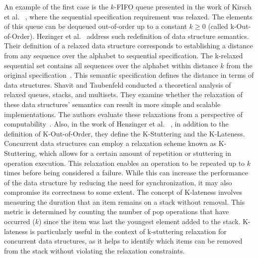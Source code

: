 An example of the first case is the \(k\)-FIFO queue presented in the work of Kirsch et al. ~\cite{DBLP_conf_pact_KirschLP13, DBLP_conf_ica3pp_KirschPRS12}, where the sequential specification requirement was relaxed. The elements of this queue can be dequeued out-of-order up to a constant \(k \ge 0\) (called k-Out-of-Order). Hezinger et al.~\cite{DBLP_conf_popl_HenzingerKPSS13} address such redefinition of data structure semantics. Their definition of a relaxed data structure corresponds to establishing a distance from any sequence over the alphabet to sequential specification. The k-relaxed sequential set contains all sequences over the alphabet within distance \(k\) from the original specification~\cite{DBLP_conf_popl_HenzingerKPSS13}. This semantic specification defines the distance in terms of data structures. Shavit and Taubenfeld conducted a theoretical analysis of relaxed queues, stacks, and multisets. They examine whether the relaxation of these data structures' semantics can result in more simple and scalable implementations. The authors evaluate these relaxations from a perspective of computability~\cite{DBLP_journals_dc_ShavitT16}. Also, in the work of Henzinger et al. ~\cite{DBLP_conf_popl_HenzingerKPSS13}, in addition to the definition of K-Out-of-Order, they define the K-Stuttering and the K-Lateness. Concurrent data structures can employ a relaxation scheme known as K-Stuttering, which allows for a certain amount of repetition or stuttering in operation execution. This relaxation enables an operation to be repeated up to \(k\) times before being considered a failure. While this can increase the performance of the data structure by reducing the need for synchronization, it may also compromise its correctness to some extent. The concept of K-lateness involves measuring the duration that an item remains on a stack without removal. This metric is determined by counting the number of pop operations that have occurred (\(k\)) since the item was last the youngest element added to the stack. K-lateness is particularly useful in the context of k-stuttering relaxation for concurrent data structures, as it helps to identify which items can be removed from the stack without violating the relaxation constraints.

